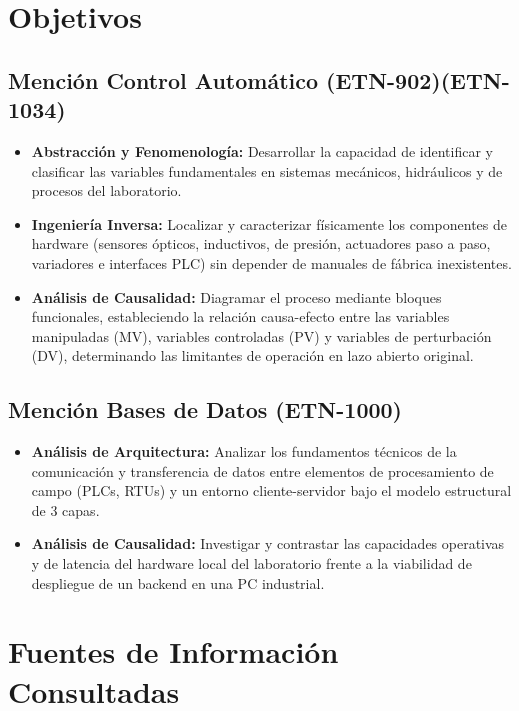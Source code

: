 \documentclass[11pt]{article}
\begin{document}
\section{Objetivos}

\subsection*{Mención Control Automático (ETN-902)(ETN-1034)}

\begin{itemize}
	\item \textbf{Abstracción y Fenomenología:} Desarrollar la capacidad de identificar y clasificar las variables fundamentales en sistemas mecánicos, hidráulicos y de procesos del laboratorio.
	\item \textbf{Ingeniería Inversa:} Localizar y caracterizar físicamente los componentes de hardware (sensores ópticos, inductivos, de presión, actuadores paso a paso, variadores e interfaces PLC) sin depender de manuales de fábrica inexistentes.
	\item \textbf{Análisis de Causalidad:} Diagramar el proceso mediante bloques funcionales, estableciendo la relación causa-efecto entre las variables manipuladas (MV), variables controladas (PV) y variables de perturbación (DV), determinando las limitantes de operación en lazo abierto original.
\end{itemize}

\subsection*{Mención Bases de Datos (ETN-1000)}

\begin{itemize}
	\item \textbf{Análisis de Arquitectura:} Analizar los fundamentos técnicos de la comunicación y transferencia de datos entre elementos de procesamiento de campo (PLCs, RTUs) y un entorno cliente-servidor bajo el modelo estructural de 3 capas.
	\item \textbf{Análisis de Causalidad:} Investigar y contrastar las capacidades operativas y de latencia del hardware local del laboratorio frente a la viabilidad de despliegue de un backend en una PC industrial.
\end{itemize}

\section{Fuentes de Información Consultadas}
\end{document}
